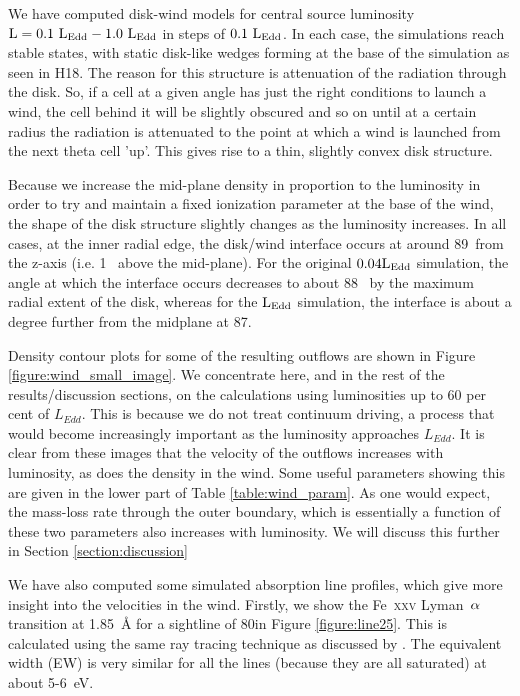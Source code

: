 \documentclass[a4paper,fleqn,usenatbib]{mnras}
\begin{document}
We have computed disk-wind models for central source luminosity 
$\rm{L=0.1~L_{Edd}-1.0~L_{Edd}}$ in steps of $\rm{0.1~L_{Edd}}$. In each case, the simulations reach stable states, 
with static disk-like wedges forming at the base of the simulation as seen in H18. The reason for this
structure is attenuation of the radiation through the disk. So, if a cell at a given angle has just the right
conditions to launch a wind, the cell behind it will be slightly obscured and so on until at a certain radius
the radiation is attenuated to the point at which a wind is launched from the next theta cell 'up'. This gives
rise to a thin, slightly convex disk structure. 

Because we increase the mid-plane density in proportion to the luminosity in order to try and maintain 
a fixed ionization parameter at the base of the wind, the shape of the disk structure slightly changes as
the luminosity increases. In all cases, at the inner radial edge, the disk/wind interface occurs at 
around 89\degree~from the z-axis (i.e. 1\degree~ above the mid-plane). For the original $\rm{0.04L_{Edd}}$ 
simulation, the angle at which the interface occurs decreases to about 88\degree~ by the maximum radial
extent of the disk, whereas for the $\rm{L_{Edd}}$ simulation, the interface is about a degree further from the
midplane at 87\degree.

Density contour plots for some of the resulting outflows are shown in Figure \ref{figure:wind_small_image}.
We concentrate here, and in the rest of the results/discussion sections, on the calculations using luminosities
up to 60 per cent of $L_{Edd}$. This is because we do not treat continuum driving, a process
that would become increasingly important as the luminosity approaches $L_{Edd}$.
It is clear from these images that the velocity of the outflows increases with luminosity, as does the 
density in the wind. Some useful parameters showing this are given in the lower part of Table \ref{table:wind_param}.
As one would expect, the mass-loss rate through the outer boundary, which is essentially a function of these 
two parameters also increases with luminosity. We will discuss this further in Section \ref{section:discussion}


We have also computed some simulated absorption line profiles, which give more insight into the velocities 
in the wind.
Firstly, we show the Fe~\textsc{xxv} Lyman~$\rm{\alpha}$ transition at 1.85~{\AA} for a sightline 
of 80\degree in Figure \ref{figure:line25}. This is calculated using the same ray tracing technique as discussed 
by \cite{2015ApJ...807..107H}. The equivalent width (EW) is very similar for all the lines (because they are all 
saturated) at about 5-6~eV. 
\end{document}
